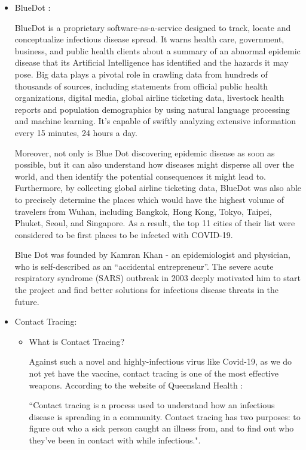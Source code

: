 \begin{itemize}
        \item BlueDot \parencite{BlueDotHome} \parencite{BlueDotCNBC}:
        \par BlueDot is a proprietary software-as-a-service designed to track, locate and conceptualize infectious disease spread. It warns health care, government, business, and public health clients about a summary of an abnormal epidemic disease that its Artificial Intelligence has identified and the hazards it may pose. Big data plays a pivotal role in crawling data from hundreds of thousands of sources, including statements from official public health organizations, digital media, global airline ticketing data, livestock health reports and population demographics by using natural language processing and machine learning. It’s capable of swiftly analyzing extensive information every 15 minutes, 24 hours a day.
        \par Moreover, not only is Blue Dot discovering epidemic disease as soon as possible, but it can also understand how diseases might disperse all over the world, and then identify the potential consequences it might lead to. Furthermore, by collecting global airline ticketing data, BlueDot was also able to precisely determine the places which would have the highest volume of travelers from Wuhan, including Bangkok, Hong Kong, Tokyo, Taipei, Phuket, Seoul, and Singapore. As a result, the top 11 cities of their list were considered to be first places to be infected with COVID-19.
        \par Blue Dot was founded by Kamran Khan - an epidemiologist and physician, who is self-described as an “accidental entrepreneur”. The severe acute respiratory syndrome (SARS) outbreak in 2003 deeply motivated him to start the project and find better solutions for infectious disease threats in the future.

        \item Contact Tracing:
        \begin{itemize}
          \item What is Contact Tracing?
          \par Against such a novel and highly-infectious virus like Covid-19, as we do not yet have the vaccine, contact tracing is one of the most effective weapons. According to the website of Queensland Health \parencite{QueenslandHealth}:
          \par ``Contact tracing is a process used to understand how an infectious disease is spreading in a community. Contact tracing has two purposes: to figure out who a sick person caught an illness from, and to find out who they’ve been in contact with while infectious.".


\end{itemize}
\end{itemize}
